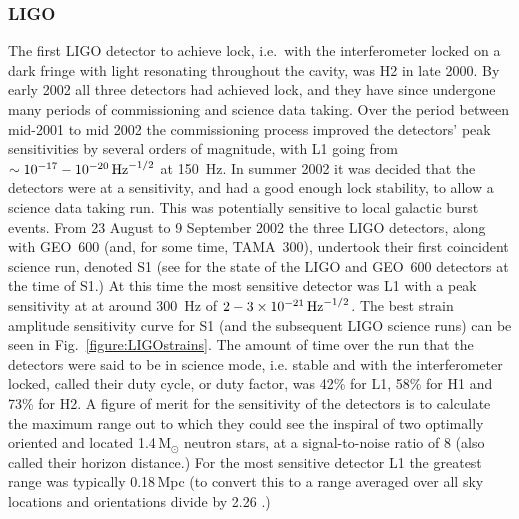 \documentclass{article}
\begin{document}

\subsubsection{LIGO}
The first LIGO detector to achieve lock, i.e.\ with the interferometer locked on
a dark fringe with light resonating throughout the cavity, was H2 in late 2000.
By early 2002 all three detectors had achieved lock, and they have since
undergone many periods of commissioning and science data taking. Over the period
between mid-2001 to mid 2002 the commissioning process improved the detectors'
peak sensitivities by several orders of magnitude, with L1 going from
$\sim10^{-17}-10^{-20}\,{\rm Hz}^{-1/2}$ at 150~Hz. In summer 2002 it was
decided that the detectors were at a sensitivity, and had a good enough lock
stability, to allow a science data taking run. This was potentially sensitive to
local galactic burst events. From 23 August to 9 September 2002 the three LIGO
detectors, along with GEO~600 (and, for some time, TAMA~300), undertook their
first coincident science run, denoted S1 (see \cite{Abbott:2004a} for the state
of the LIGO and GEO~600 detectors at the time of S1.) At this time the most
sensitive detector was L1 with a peak sensitivity at at around 300~Hz of
$2-3\times10^{-21}\,{\rm Hz}^{-1/2}$. The best strain amplitude sensitivity
curve for S1 (and the subsequent LIGO science runs) can be seen in
Fig.~\ref{figure:LIGOstrains}. The amount of time over the run that the
detectors were said to be in science mode, i.e. stable and with the
interferometer locked, called their duty cycle, or duty factor, was 42\% for L1,
58\% for H1 and 73\% for H2. A figure of merit for the sensitivity of the
detectors is to calculate the maximum range out to which they could see the
inspiral of two optimally oriented and located 1.4\,M$_{\odot}$ neutron stars,
at a signal-to-noise ratio of 8 \cite{Abbott:2005b} (also called their horizon
distance.) For the most sensitive detector L1 the greatest range was typically
0.18\,Mpc (to convert this to a range averaged over all sky locations and
orientations divide by 2.26 \cite{Sutton:2003}.)
\end{document}

